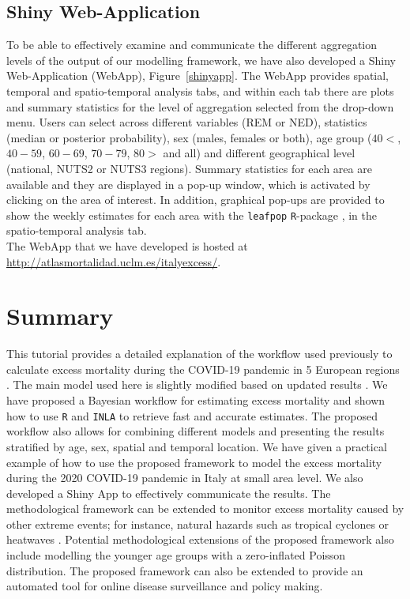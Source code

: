 \subsection{Shiny Web-Application}
To be able to effectively examine and communicate the different aggregation levels of the output of our modelling framework, we have also developed a Shiny Web-Application (WebApp), Figure~\ref{shinyapp}. The WebApp provides spatial, temporal and spatio-temporal analysis tabs, and within each tab there are plots and summary statistics for the level of aggregation selected from the drop-down menu. Users can select across different variables (REM or NED), statistics (median or posterior probability), sex (males, females or both), age group ($40<$, $40-59$, $60-69$, $70-79$, $80>$ and all) and different geographical level (national, NUTS2 or NUTS3 regions). Summary statistics for each area are available and they are displayed in a pop-up window, which is activated by clicking on the area of interest. In addition, graphical pop-ups are provided to show the weekly estimates for each area with the \texttt{leafpop} \texttt{R}-package \citep{leafpop}, in the spatio-temporal analysis tab. \\
The WebApp that we have developed is hosted at \url{http://atlasmortalidad.uclm.es/italyexcess/}.  
		
\section{Summary}
This tutorial provides a detailed explanation of the workflow used previously to calculate excess mortality during the COVID-19 pandemic in 5 European regions \citep{konstantinoudis2021regional}. The main model used here is slightly modified based on updated results \citep{riou2023direct}. We have proposed a Bayesian workflow for estimating excess mortality and shown how to use \texttt{R} and \texttt{INLA} to retrieve fast and accurate estimates. The proposed workflow also allows for combining different models and presenting the results stratified by age, sex, spatial and temporal location. We have given a practical example of how to use the proposed framework to model the excess mortality during the 2020 COVID-19 pandemic in Italy at small area level. We also developed a Shiny App to effectively communicate the results. The methodological framework can be extended to monitor excess mortality caused by other extreme events; for instance, natural hazards such as tropical cyclones \citep{parks2022association} or heatwaves \citep{konstantinoudis2023bayesian}. Potential methodological extensions of the proposed framework also include modelling the younger age groups with a zero-inflated Poisson distribution. The proposed framework can also be extended to provide an automated tool for online disease surveillance and policy making. 
			
